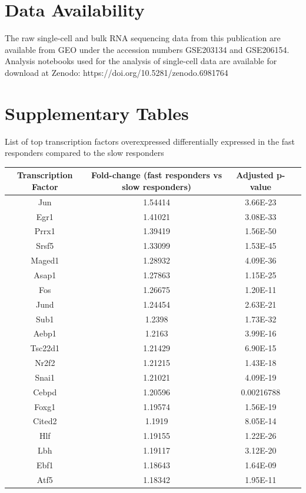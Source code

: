 \section{Data Availability}
The raw single-cell and bulk RNA sequencing data from this publication are available from GEO under the accession numbers GSE203134 and GSE206154. Analysis notebooks used for the analysis of single-cell data are available for download at Zenodo: https://doi.org/10.5281/zenodo.6981764



\clearpage
\section{Supplementary Tables}
\begin{supptable}[p]
\centering
\caption{List of top transcription factors overexpressed differentially expressed in the fast responders compared to the slow responders}
\begin{tabular}{ cccc }
\toprule
\textbf{Transcription Factor} & \textbf{Fold-change (fast responders vs slow responders)} & \textbf{Adjusted p-value} \\
\midrule
Jun & 1.54414 & 3.66E-23 \\
Egr1 & 1.41021 & 3.08E-33 \\
Prrx1 & 1.39419 & 1.56E-50 \\
Srsf5 & 1.33099 & 1.53E-45 \\
Maged1 & 1.28932 & 4.09E-36 \\
Asap1 & 1.27863 & 1.15E-25 \\
Fos & 1.26675 & 1.20E-11 \\
Jund & 1.24454 & 2.63E-21 \\
Sub1 & 1.2398 & 1.73E-32 \\
Aebp1 & 1.2163 & 3.99E-16 \\
Tsc22d1 & 1.21429 & 6.90E-15 \\
Nr2f2 & 1.21215 & 1.43E-18 \\
Snai1 & 1.21021 & 4.09E-19 \\
Cebpd & 1.20596 & 0.00216788 \\
Foxg1 & 1.19574 & 1.56E-19 \\
Cited2 & 1.1919 & 8.05E-14 \\
Hlf & 1.19155 & 1.22E-26 \\
Lbh & 1.19117 & 3.12E-20 \\
Ebf1 & 1.18643 & 1.64E-09 \\
Atf5 & 1.18342 & 1.95E-11 \\

\end{tabular}
\end{supptable}
